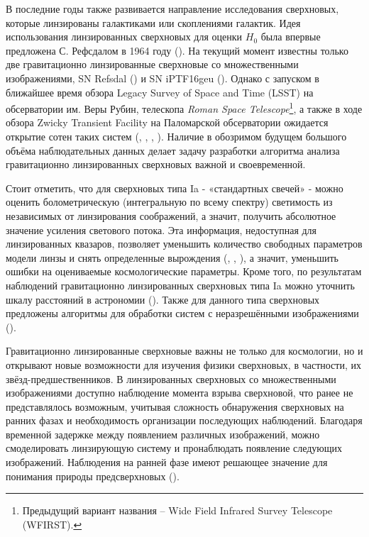 В последние годы также развивается направление исследования сверхновых, которые линзированы галактиками или скоплениями галактик. Идея использования линзированных сверхновых для оценки $H_0$ была впервые предложена С. Рефсдалом в 1964 году (\cite{refsdal1964}). На текущий момент известны только две гравитационно линзированные сверхновые со множественными изображениями, SN Refsdal (\cite{kelly2014}) и SN iPTF16geu (\cite{goobar2017}). Однако с запуском в ближайшее время обзора Legacy Survey of Space and Time (LSST) на обсерватории им. Веры Рубин, телескопа \textit{Roman Space Telescope}\footnote{Предыдущий вариант названия -- Wide Field Infrared Survey Telescope (WFIRST).}, а также в ходе обзора Zwicky Transient Facility на Паломарской обсерватории ожидается открытие сотен таких систем (\cite{ogurimarshall}, \cite{goldsteinnugent2017}, \cite{veracrubin}, \cite{rst}). Наличие в обозримом будущем большого объёма наблюдательных данных делает задачу разработки алгоритма анализа гравитационно линзированных сверхновых важной и своевременной. 


Стоит отметить, что для сверхновых типа Ia - «стандартных свечей» - можно оценить болометрическую (интегральную по всему спектру) светимость из независимых от линзирования соображений, а значит, получить абсолютное значение усиления светового потока. Эта информация, недоступная для линзированных квазаров, позволяет уменьшить количество свободных параметров модели линзы и снять определенные вырождения (\cite{falco1985}, \cite{holz2001}, \cite{ogurikawano2003}), а значит, уменьшить ошибки на  оцениваемые космологические параметры. Кроме того, по результатам наблюдений гравитационно линзированных сверхновых типа Ia можно уточнить шкалу расстояний в астрономии (\cite{ddr}). Также для данного типа сверхновых предложены алгоритмы для обработки систем с неразрешёнными изображениями (\cite{beitunresolved}). 

Гравитационно линзированные сверхновые важны не только для космологии, но и открывают новые возможности для изучения физики сверхновых, в частности, их звёзд-предшественников. В линзированных сверхновых со множественными изображениями доступно наблюдение момента взрыва сверхновой, что ранее не представлялось возможным, учитывая сложность обнаружения сверхновых на ранних фазах и необходимость организации последующих наблюдений. Благодаря временной задержке между появлением различных изображений, можно смоделировать линзирующую систему и пронаблюдать появление следующих изображений. Наблюдения на ранней фазе имеют решающее значение для понимания природы предсверхновых (\cite{holismokesI}).

